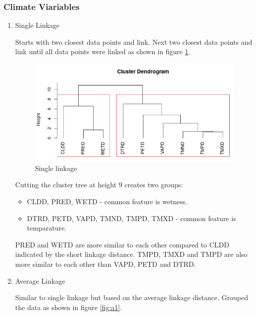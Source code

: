 \documentclass[12pt,a4paper]{article}
\begin{document}
\subsubsection{Climate Viariables}
\begin{enumerate}[label=\roman*)]
	\item Single Linkage

\noindent Starts with two closest data points and link. Next two closest data points and link until all data points were linked as shown in figure \ref{fig:rplots1}.


\begin{figure}[h]
	\centering
	\includegraphics[width=0.7\linewidth]{S1}
	\caption{Single linkage}
	\label{fig:rplots1}
\end{figure}
\noindent Cutting the cluster tree at height 9 creates two groups:
\begin{itemize}
	\item CLDD, PRED, WETD - common feature is wetness.
	\item DTRD, PETD, VAPD, TMND, TMPD, TMXD - common feature is temparature.
\end{itemize} 
PRED and WETD are more similar to each other compared to CLDD indicated by the short linkage distance. TMPD, TMXD and TMPD are also more similar to each other than VAPD, PETD and DTRD.

\item Average Linkage

\noindent Similar to single linkage but based on the average linkage distance. Grouped the data as shown in figure \ref{fig:a1}.


\end{enumerate}
\end{document}
